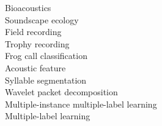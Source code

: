 %



\begin{keywords}
Bioacoustics \\
Soundscape ecology\\
Field recording \\
Trophy recording\\
Frog call classification \\
Acoustic feature \\
Syllable segmentation\\
Wavelet packet decomposition \\
Multiple-instance multiple-label learning \\
Multiple-label learning \\
 
\end{keywords}







